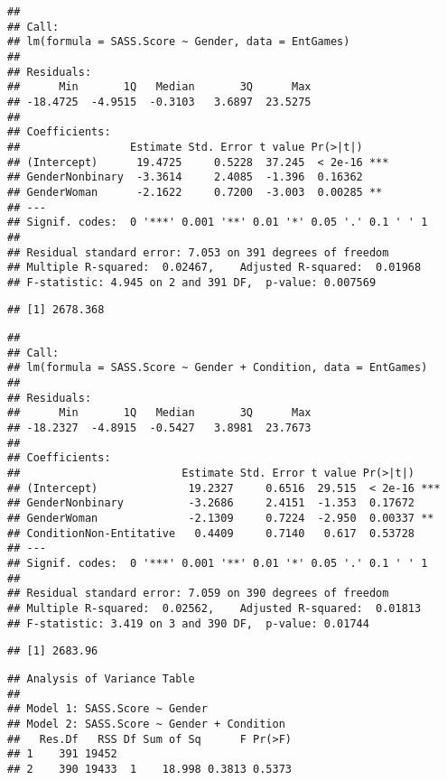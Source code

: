 \documentclass[
  doc,draftall]{apa6}
\begin{document}
\begin{verbatim}
## 
## Call:
## lm(formula = SASS.Score ~ Gender, data = EntGames)
## 
## Residuals:
##      Min       1Q   Median       3Q      Max 
## -18.4725  -4.9515  -0.3103   3.6897  23.5275 
## 
## Coefficients:
##                 Estimate Std. Error t value Pr(>|t|)    
## (Intercept)      19.4725     0.5228  37.245  < 2e-16 ***
## GenderNonbinary  -3.3614     2.4085  -1.396  0.16362    
## GenderWoman      -2.1622     0.7200  -3.003  0.00285 ** 
## ---
## Signif. codes:  0 '***' 0.001 '**' 0.01 '*' 0.05 '.' 0.1 ' ' 1
## 
## Residual standard error: 7.053 on 391 degrees of freedom
## Multiple R-squared:  0.02467,    Adjusted R-squared:  0.01968 
## F-statistic: 4.945 on 2 and 391 DF,  p-value: 0.007569
\end{verbatim}

\begin{verbatim}
## [1] 2678.368
\end{verbatim}

\begin{verbatim}
## 
## Call:
## lm(formula = SASS.Score ~ Gender + Condition, data = EntGames)
## 
## Residuals:
##      Min       1Q   Median       3Q      Max 
## -18.2327  -4.8915  -0.5427   3.8981  23.7673 
## 
## Coefficients:
##                         Estimate Std. Error t value Pr(>|t|)    
## (Intercept)              19.2327     0.6516  29.515  < 2e-16 ***
## GenderNonbinary          -3.2686     2.4151  -1.353  0.17672    
## GenderWoman              -2.1309     0.7224  -2.950  0.00337 ** 
## ConditionNon-Entitative   0.4409     0.7140   0.617  0.53728    
## ---
## Signif. codes:  0 '***' 0.001 '**' 0.01 '*' 0.05 '.' 0.1 ' ' 1
## 
## Residual standard error: 7.059 on 390 degrees of freedom
## Multiple R-squared:  0.02562,    Adjusted R-squared:  0.01813 
## F-statistic: 3.419 on 3 and 390 DF,  p-value: 0.01744
\end{verbatim}

\begin{verbatim}
## [1] 2683.96
\end{verbatim}

\begin{verbatim}
## Analysis of Variance Table
## 
## Model 1: SASS.Score ~ Gender
## Model 2: SASS.Score ~ Gender + Condition
##   Res.Df   RSS Df Sum of Sq      F Pr(>F)
## 1    391 19452                           
## 2    390 19433  1    18.998 0.3813 0.5373
\end{verbatim}
\end{document}
